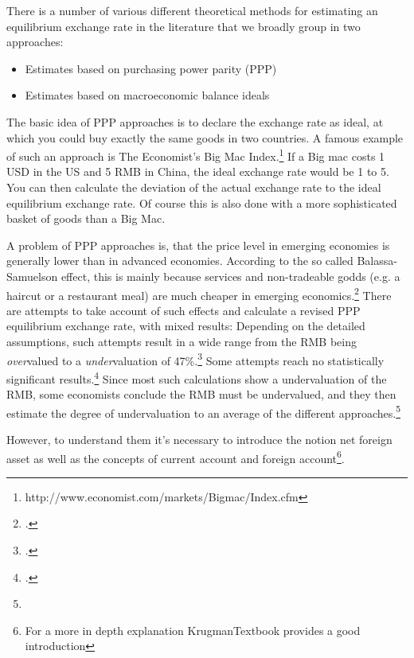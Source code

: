 
There is a number of various different theoretical methods for estimating an 
equilibrium exchange rate in the literature that we broadly group in two approaches:

\begin{itemize}
\item{Estimates based on purchasing power parity (PPP)}
\item{Estimates based on macroeconomic balance ideals}
\end{itemize}


The basic idea of PPP approaches is to declare the exchange rate as ideal, at which you could buy exactly the same goods in two countries. A famous example of such an approach is The Economist's Big Mac Index.\footnote{http://www.economist.com/markets/Bigmac/Index.cfm} If a Big mac costs 1 USD in the US and 5 RMB in China, the ideal exchange rate would be 1 to 5. You can then calculate the deviation of the actual exchange rate to the ideal equilibrium exchange rate. Of course this is also done with a more sophisticated basket of goods than a Big Mac. 

A problem of PPP approaches is, that the price level in emerging economies is generally lower than in advanced economies. According to the so called Balassa-Samuelson effect, this is mainly because services and non-tradeable godds (e.g. a haircut or a restaurant meal) are much cheaper in emerging economics.\footnote{\cite[pp. 82]{CheungChinn2010}.} There are attempts to take account of such effects and calculate a revised PPP equilibrium exchange rate, with mixed results: Depending on the detailed assumptions, such attempts result in a wide range from the RMB being \emph{over}valued to a \emph{under}valuation of 47\%.\footnote{\cite[pp. 72]{Subramanian}.} Some attempts reach no statistically significant results.\footnote{\cite[p. 83]{CheungChinn2010}.} Since most such calculations show a undervaluation of the RMB, some economists conclude the RMB must be undervalued, and they then estimate the degree of undervaluation to an average of the different approaches.\footnote{}%


However, to understand them it's necessary to introduce the notion net 
foreign asset as well as the concepts of current account and foreign 
account\footnote{For a more in depth explanation \cite{ch.  
18}{KrugmanTextbook} provides a good introduction}.

